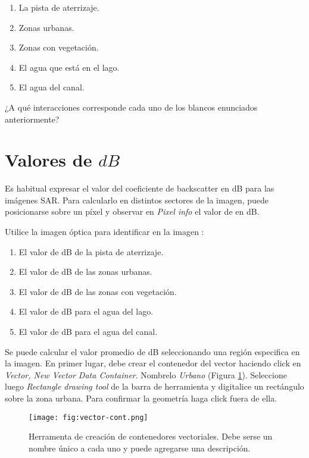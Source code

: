 \begin{enumerate}
    \item La pista de aterrizaje.
    \item Zonas urbanas.
    \item Zonas con vegetación.
    \item El agua que está en el lago.
    \item El agua del canal.
\end{enumerate}

\begin{que}
    ¿A qué interacciones corresponde cada uno de los blancos enunciados anteriormente?
\end{que}

\section{Valores de $dB$}

Es habitual expresar el valor del coeficiente de backscatter en dB para las imágenes SAR. Para calcularlo en distintos sectores de la imagen, puede posicionarse sobre un píxel y observar en \emph{Pixel info} el valor de  en dB.


Utilice la imagen óptica para identificar en la imagen :

 \begin{enumerate}
     \item El valor de dB de la pista de aterrizaje.
     \item El valor de dB de las zonas urbanas.
     \item El valor de dB de las zonas con vegetación.
     \item El valor de dB para el agua del lago.
     \item El valor de dB para el agua del canal.
 \end{enumerate}


Se puede calcular el valor promedio de dB seleccionando una región especifica en la imagen. En primer lugar, debe crear el contenedor del vector haciendo click en \emph{Vector, New Vector Data Container}. Nombrelo \emph{Urbano} (Figura \ref{fig:vector-cont}). Seleccione luego  \emph{Rectangle drawing tool} de la barra de herramienta y digitalice un rectángulo sobre la zona urbana. Para confirmar la geometría haga click fuera de ella.


\begin{figure}[h!]
    \centering
    \texttt{[image: fig:vector-cont.png]}
    \caption{Herramenta de creación de contenedores vectoriales. Debe serse un nombre único a cada uno y puede agregarse una descripción.}
    \label{fig:vector-cont}
\end{figure}

